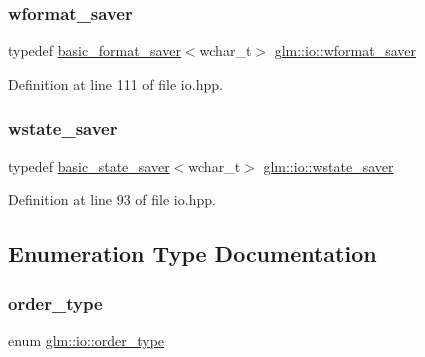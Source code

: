 \mbox{\label{namespaceglm_1_1io_a6229ca888648a0ff823eb120f61de481}} 
\subsubsection{\texorpdfstring{wformat\_saver}{wformat\_saver}}
{\footnotesize\ttfamily typedef \mbox{\hyperlink{classglm_1_1io_1_1basic__format__saver}{basic\+\_\+format\+\_\+saver}}$<$wchar\+\_\+t$>$ \mbox{\hyperlink{namespaceglm_1_1io_a6229ca888648a0ff823eb120f61de481}{glm\+::io\+::wformat\+\_\+saver}}}



Definition at line 111 of file io.\+hpp.

\mbox{\label{namespaceglm_1_1io_a7a46501fc459c05fa3dc0f2bcbf3e92f}} 
\subsubsection{\texorpdfstring{wstate\_saver}{wstate\_saver}}
{\footnotesize\ttfamily typedef \mbox{\hyperlink{classglm_1_1io_1_1basic__state__saver}{basic\+\_\+state\+\_\+saver}}$<$wchar\+\_\+t$>$ \mbox{\hyperlink{namespaceglm_1_1io_a7a46501fc459c05fa3dc0f2bcbf3e92f}{glm\+::io\+::wstate\+\_\+saver}}}



Definition at line 93 of file io.\+hpp.



\subsection{Enumeration Type Documentation}
\mbox{\label{namespaceglm_1_1io_a3497781803fe594a37177e05ab2a795f}} 
\subsubsection{\texorpdfstring{order\_type}{order\_type}}
{\footnotesize\ttfamily enum \mbox{\hyperlink{namespaceglm_1_1io_a3497781803fe594a37177e05ab2a795f}{glm\+::io\+::order\+\_\+type}}}

